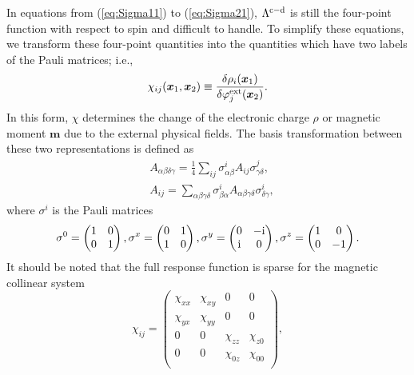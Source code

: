 %
In equations from (\ref{eq:Sigma11}) to (\ref{eq:Sigma21}), $\Lambda^{\rm c - \rm d}$ is still the
four-point function with respect to spin and difficult to handle.
To simplify these equations, we transform these four-point quantities into the quantities which have
two labels of the Pauli matrices; i.e.,
%
\begin{equation}
	\chi_{ij}(\bm x_1, \bm x_2) \equiv 
	\frac{\delta\rho_i(\bm x_1)}{\delta\varphi^{\rm ext}_{j}(\bm x_2)}.
	\label{eq:Paulichi}
\end{equation}
%
In this form, $\chi$ determines the change of the electronic charge $\rho$ or magnetic moment $\bm m$
due to the external physical fields.
The basis transformation between these two representations is defined as 
%
\begin{equation}
	\begin{split}
	& A_{\alpha\beta\delta\gamma} = \frac{1}{4}\sum_{ij}
	\sigma^{i}_{\alpha\beta}A_{ij}\sigma^{j}_{\gamma\delta}, \\
	& A_{ij} = \sum_{\alpha\beta\gamma\delta}
	\sigma^{i}_{\beta\alpha}A_{\alpha\beta\gamma\delta}\sigma^{i}_{\delta\gamma},
	\label{eq:basistrans}
\end{split}
\end{equation}
%
where $\sigma^{i}$ is the Pauli matrices
%
\begin{equation}
	\sigma^0 = 
	\begin{pmatrix}
		1 & 0 \\
		0 & 1
	\end{pmatrix},
	\sigma^x = 
	\begin{pmatrix}
		0 & 1 \\
		1 & 0
	\end{pmatrix},
	\sigma^y = 
	\begin{pmatrix}
		0 & -\rm i \\
		\rm i & 0
	\end{pmatrix},
	\sigma^z = 
	\begin{pmatrix}
		1 & 0 \\
		0 & -1
	\end{pmatrix}.
	\label{eq:Pauli}
\end{equation}
%
It should be noted that the full response function is sparse for the magnetic collinear system
%
\begin{equation}
	\chi_{ij} = 
	\begin{pmatrix}
		\chi_{xx} & \chi_{xy} & 0 & 0 \\
		\chi_{yx} & \chi_{yy} & 0 & 0 \\
		0 & 0 & \chi_{zz} & \chi_{z0} \\
		0 & 0 & \chi_{0z} & \chi_{00} \\
	\end{pmatrix},
	\label{eq:sparsechi}
\end{equation}
